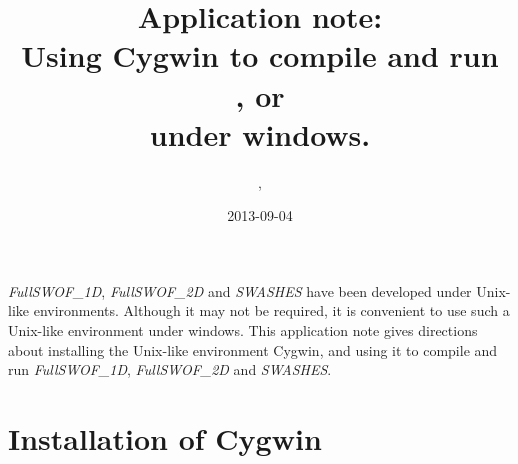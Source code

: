 \documentclass[a4paper, 11pt]{article}
\title{Application note:\\
Using Cygwin to compile and run\\
\FullSWOFoneD, \FullSWOFtwoD{} or \SWASHES{}\\
under windows.}
\author{\contactFullName, \contactEmail}
\date{2013-09-04}
\newcommand{\FullSWOFoneD}{\emph{FullSWOF\_1D}}
\newcommand{\FullSWOFtwoD}{\emph{FullSWOF\_2D}}
\newcommand{\SWASHES}{\emph{SWASHES}}
\begin{document}
\maketitle

\thispagestyle{fancy}

\FullSWOFoneD, \FullSWOFtwoD{} and \SWASHES{} have been developed under Unix-like environments. Although it may not be required, it is convenient to use such a Unix-like environment under windows. This application note gives directions about installing the Unix-like environment Cygwin, and using it to compile and run  \FullSWOFoneD, \FullSWOFtwoD{} and \SWASHES{}.

\section{Installation of Cygwin}
\end{document}
